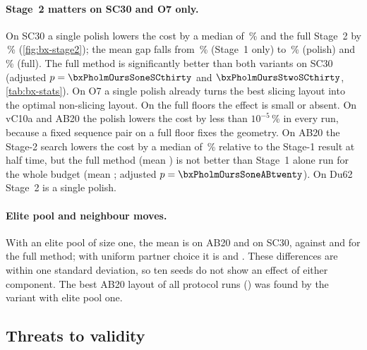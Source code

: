 \paragraph{Stage~2 matters on SC30 and O7 only.} On SC30 a single polish lowers the cost by a median of
\bxStageTwoMedRedOursStwoSCthirty\,\% and the full Stage~2 by \bxStageTwoMedRedOursSCthirty\,\%
(\cref{fig:bx-stage2}); the mean gap falls from \bxGapMeanOursSoneSCthirty\,\% (Stage~1 only) to
\bxGapMeanOursStwoSCthirty\,\% (polish) and \bxGapMeanOursSCthirty\,\% (full). The full method is significantly better
than both variants on SC30 (adjusted $p=\bxPholmOursSoneSCthirty$ and $\bxPholmOursStwoSCthirty$,
\cref{tab:bx-stats}). On O7 a single polish already turns the best slicing layout into the optimal non-slicing
layout. On the full floors the effect is small or absent. On vC10a and AB20 the polish lowers the cost by less than
$10^{-5}$\,\% in every run, because a fixed sequence pair on a full floor fixes the geometry. On AB20 the Stage-2
search lowers the cost by a median of \bxStageTwoMedRedOursABtwenty\,\% relative to the Stage-1 result at half time,
but the full method (mean \bxMeanOursABtwenty) is not better than Stage~1 alone run for the whole budget (mean
\bxMeanOursSoneABtwenty; adjusted $p=\bxPholmOursSoneABtwenty$). On Du62 Stage~2 is a single polish.

\paragraph{Elite pool and neighbour moves.} With an elite pool of size one, the mean is
\bxMeanOursNoEliteABtwenty{} on AB20 and \bxMeanOursNoEliteSCthirty{} on SC30, against \bxMeanOursABtwenty{}
and \bxMeanOursSCthirty{} for the full method; with uniform partner choice it is \bxMeanOursUnifABtwenty{} and
\bxMeanOursUnifSCthirty. These differences are within one standard deviation, so ten seeds do not show an effect
of either component. The best AB20 layout of all protocol runs (\bxBestOursNoEliteABtwenty) was found by the
variant with elite pool one.

\subsection{Threats to validity}
\label{sec:bx-threats}

